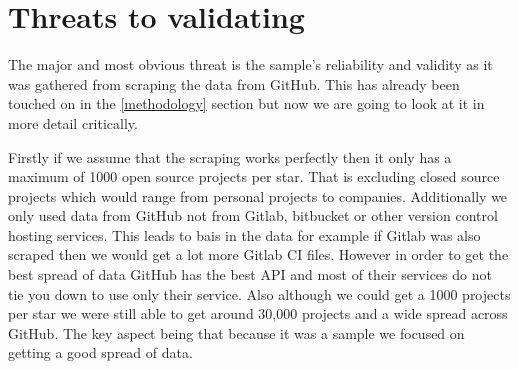 \documentclass[10pt,conference]{IEEEtran}
\begin{document}



\pagebreak

\section{Threats to validating}

The major and most obvious threat is the sample's reliability and validity as it was gathered from scraping the data from GitHub. This has already been touched on in the \ref{methodology} section but now we are going to look at it in more detail critically.

Firstly if we assume that the scraping works perfectly then it only has a maximum of 1000 open source projects per star. That is excluding closed source projects which would range from personal projects to companies. Additionally we only used data from GitHub not from Gitlab, bitbucket or other version control hosting services. This leads to bais in the data for example if Gitlab was also scraped then we would get a lot more Gitlab CI files. However in order to get the best spread of data GitHub has the best API and most of their services do not tie you down to use only their service. Also although we could get a 1000 projects per star we were still able to get around 30,000 projects and a wide spread across GitHub. The key aspect being that because it was a sample we focused on getting a good spread of data.
\end{document}
